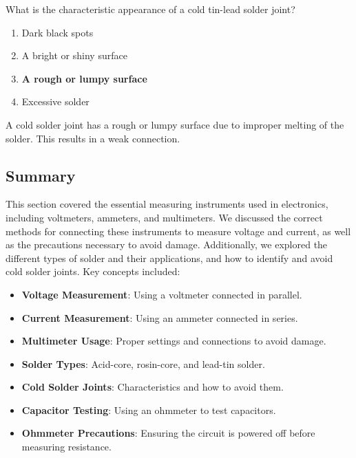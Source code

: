 \begin{tcolorbox}[colback=gray!10!white,colframe=black!75!black,title={T7D09}]
    What is the characteristic appearance of a cold tin-lead solder joint?
    \begin{enumerate}[label=\Alph*,noitemsep]
        \item Dark black spots
        \item A bright or shiny surface
        \item \textbf{A rough or lumpy surface}
        \item Excessive solder
    \end{enumerate}
\end{tcolorbox}
A cold solder joint has a rough or lumpy surface due to improper melting of the solder. This results in a weak connection.

\subsection*{Summary}
This section covered the essential measuring instruments used in electronics, including voltmeters, ammeters, and multimeters. We discussed the correct methods for connecting these instruments to measure voltage and current, as well as the precautions necessary to avoid damage. Additionally, we explored the different types of solder and their applications, and how to identify and avoid cold solder joints. Key concepts included:
\begin{itemize}
    \item \textbf{Voltage Measurement}: Using a voltmeter connected in parallel.
    \item \textbf{Current Measurement}: Using an ammeter connected in series.
    \item \textbf{Multimeter Usage}: Proper settings and connections to avoid damage.
    \item \textbf{Solder Types}: Acid-core, rosin-core, and lead-tin solder.
    \item \textbf{Cold Solder Joints}: Characteristics and how to avoid them.
    \item \textbf{Capacitor Testing}: Using an ohmmeter to test capacitors.
    \item \textbf{Ohmmeter Precautions}: Ensuring the circuit is powered off before measuring resistance.
\end{itemize}
